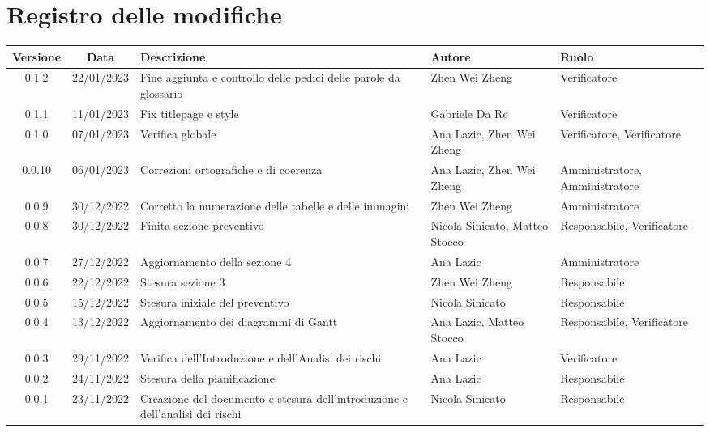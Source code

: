 \section*{Registro delle modifiche}
\begin{center}
	\renewcommand\tabularxcolumn[1]{>{\Centering}m{#1}}
	\begin{tabularx}{\textwidth}{| c | c | X | X | X |} 
		\hline
		\textbf{Versione} & \textbf{Data} & \textbf{Descrizione} & 	\textbf{Autore} & \textbf{Ruolo}\\
		\hline
 		0.1.2 & 22/01/2023 & Fine aggiunta e controllo delle pedici delle parole da glossario & Zhen Wei Zheng & Verificatore \\
	    \hline
		0.1.1 & 11/01/2023 & Fix titlepage e style & Gabriele Da Re & Verificatore \\
	    \hline
		0.1.0 & 07/01/2023 & Verifica globale & Ana Lazic, Zhen Wei Zheng & Verificatore, Verificatore \\
	    \hline
		0.0.10 & 06/01/2023 & Correzioni ortografiche e di coerenza & Ana Lazic, Zhen Wei Zheng & Amministratore, Amministratore \\
		\hline
		0.0.9 & 30/12/2022 & Corretto la numerazione delle tabelle e delle immagini & Zhen Wei Zheng & Amministratore\\
		\hline
		0.0.8 & 30/12/2022 & Finita sezione preventivo & Nicola Sinicato, Matteo Stocco & Responsabile, Verificatore\\
		\hline
		0.0.7 & 27/12/2022 & Aggiornamento della sezione 4 & Ana Lazic & 	Amministratore\\
		\hline
		0.0.6 & 22/12/2022 & Stesura sezione 3 & Zhen Wei Zheng & Responsabile\\
		\hline
		0.0.5 & 15/12/2022 & Stesura iniziale del preventivo & Nicola Sinicato & Responsabile\\
		\hline
		0.0.4 & 13/12/2022 & Aggiornamento dei diagrammi di Gantt & Ana Lazic, Matteo Stocco & Responsabile, Verificatore\\
		\hline
		0.0.3 & 29/11/2022 & Verifica dell'Introduzione e dell'Analisi dei rischi & Ana Lazic & Verificatore\\
		\hline
		0.0.2 & 24/11/2022 & Stesura della pianificazione & Ana Lazic & Responsabile\\
		\hline
		0.0.1 & 23/11/2022 & Creazione del documento e stesura dell'introduzione e dell'analisi dei rischi & Nicola Sinicato & Responsabile\\
		\hline
	\end{tabularx}
\end{center}
	
	

